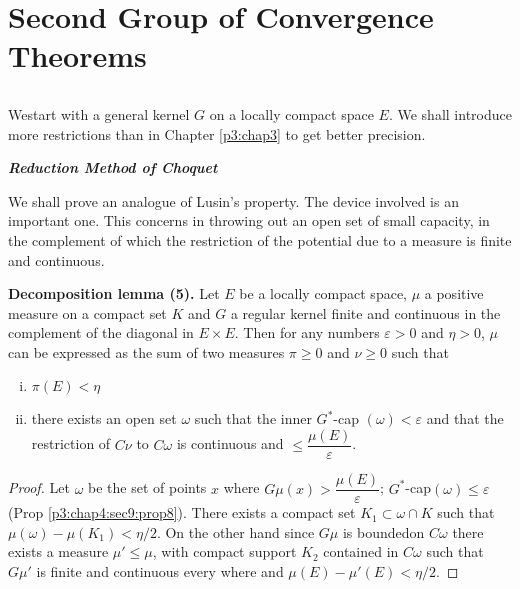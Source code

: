 
\chapter{Second Group of Convergence Theorems}\label{p3:chap5} %

\setcounter{section}{12}
\section{}\label{p3:chap5:sec13} %

We\pageoriginale start with a general kernel $G$ on a locally compact
space $E$. We 
shall introduce more restrictions than in Chapter \ref{p3:chap3} to get better
precision. 

\medskip
\noindent
\textbf{\textit{Reduction Method of Choquet}}

We shall prove an analogue of Lusin's property. The device  involved
is an important one. This concerns in throwing out an open set of
small capacity, in the complement of which the restriction of the
potential due to a measure is finite and continuous. 

\noindent 
\textbf{Decomposition lemma (5).}
Let $E$ be a  locally compact space, $\mu$ a positive measure on a
compact set $K$ and $G$ a regular kernel finite and continuous in the
complement of the diagonal in $ E \times E $. Then for any numbers  $
\varepsilon > 0 $ and $ \eta > 0 $, $\mu$ can be expressed as the sum
of two measures $ \pi \geq 0 $ and $ \nu \geq 0 $ such that  
\begin{enumerate}[(i)]
\item $ \pi (E) < \eta $
\item there exists an open set $\omega$ such that the inner $G^*$-cap
  $ (\omega) < \varepsilon $ and that the restriction of $C \nu$ to $C
  \omega $ is continuous and  $ \leq \dfrac{\mu (E)}{\varepsilon} $. 
\end{enumerate} 

\begin{proof}
  Let $\omega$ be the set of points $x$ where $ G \mu (x) > \dfrac{\mu
    (E)}{\varepsilon} $; $ G^*$-cap$ ( \omega ) \leq \varepsilon $ 
  (Prop \ref{p3:chap4:sec9:prop8}). There exists  a compact set $ K_1
  \subset \omega \cap K $ 
  such that $ \mu ( \omega ) - \mu (K_1) < \eta /2 $. On the other
  hand since $G \mu$ is  bounded\pageoriginale on $ C \omega $ there exists a
  measure  $\mu' \leq \mu$, with compact support  $K_2$ contained in $
  C \omega $ such that  $ G \mu' $ is finite and continuous every
  where and  $\mu(E)-\mu'(E) < \eta / 2$.  
\end{proof}

